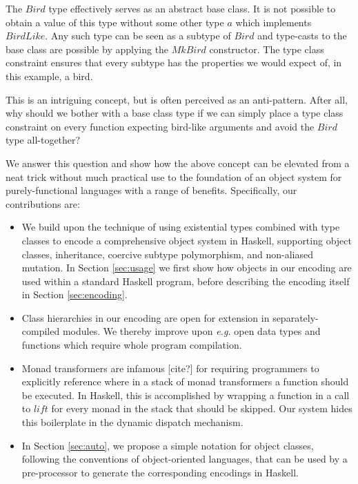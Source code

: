 \documentclass[runningheads,a4paper]{llncs}
\newcommand{\todo}[1]{[{\color{blue}#1}]}
\begin{document}
The $\mathit{Bird}$ type effectively serves as an abstract base class. It is not possible to obtain a value of this type without some other type $a$ which implements $\mathit{BirdLike}$. Any such type can be seen as a subtype of $\mathit{Bird}$ and type-casts to the base class are possible by applying the $\mathit{MkBird}$ constructor. The type class constraint ensures that every subtype has the properties we would expect of, in this example, a bird.

This is an intriguing concept, but is often perceived as an anti-pattern. After all, why should we bother with a base class type if we can simply place a type class constraint on every function expecting bird-like arguments and avoid the $\mathit{Bird}$ type all-together?

We answer this question and show how the above concept can be elevated from a neat trick without much practical use to the foundation of an object system for purely-functional languages with a range of benefits. Specifically, our contributions are:
\begin{itemize}
\item We build upon the technique of using existential types combined with type classes to encode a comprehensive object system in Haskell, supporting object classes, inheritance, coercive subtype polymorphism, and non-aliased mutation. In Section \ref{sec:usage} we first show how objects in our encoding are used within a standard Haskell program, before describing the encoding itself in Section \ref{sec:encoding}.
\item Class hierarchies in our encoding are open for extension in separately-compiled modules. We thereby improve upon \emph{e.g.} open data types and functions \cite{loh2006open} which require whole program compilation.
\item Monad transformers \cite{moggi} are infamous \todo{cite?} for requiring programmers to explicitly reference where in a stack of monad transformers a function should be executed. In Haskell, this is accomplished by wrapping a function in a call to $\mathit{lift}$ for every monad in the stack that should be skipped. Our system hides this boilerplate in the dynamic dispatch mechanism. 
\item In Section \ref{sec:auto}, we propose a simple notation for object classes, following the conventions of object-oriented languages, that can be used by a pre-processor to generate the corresponding encodings in Haskell.
\end{itemize}
\end{document}
